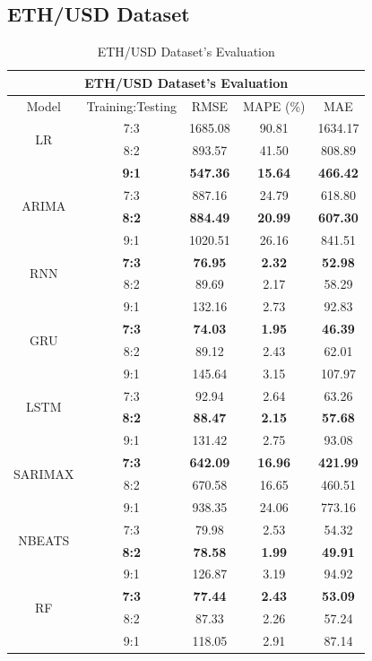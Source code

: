 \documentclass{ieeeojies}
\begin{document}
\subsection{ETH/USD Dataset}
\begin{table}[H]
	\centering
	\begin{tabular}{|c|c|c|c|c|}
		\hline
		\multicolumn{5}{|c|}{\textbf{ETH/USD Dataset's Evaluation}}\\
		\hline
		\centering Model & Training:Testing & RMSE & MAPE (\%) & MAE\\
		\hline
		\multirow{2}{*}{LR} & 7:3 & 1685.08 &  90.81 &  1634.17 \\ & 8:2 & 893.57 & 41.50 & 808.89 \\ & \textbf{9:1} & \textbf{547.36} & \textbf{15.64} & \textbf{466.42}\\
		\hline
		\multirow{2}{*}{ARIMA} & 7:3 & 887.16 & 24.79 & 618.80 \\ & \textbf{8:2} & \textbf{884.49}& \textbf{20.99} & \textbf{607.30} \\ & 9:1 & 1020.51 & 26.16 & 841.51\\
		\hline
		\multirow{2}{*}{RNN} & \textbf{7:3} & \textbf{76.95} & \textbf{2.32} & \textbf{52.98}\\ & 8:2& 89.69 & 2.17 & 58.29 \\ & 9:1 & 132.16 & 2.73 & 92.83\\
		\hline
		\multirow{2}{*}{GRU} & \textbf{7:3}	& \textbf{74.03} &  \textbf{1.95} &  \textbf{46.39} \\ & 8:2 & 89.12 & 2.43 & 62.01 \\ & 9:1 & 145.64  & 3.15 & 107.97\\
		\hline
		\multirow{2}{*}{LSTM} & 7:3 &  92.94 &  2.64 & 63.26 \\ & \textbf{8:2} &  \textbf{88.47} & \textbf{2.15} &  \textbf{57.68} \\ & 9:1 & 131.42  & 2.75 & 93.08\\
		\hline
		\multirow{2}{*}{SARIMAX} & \textbf{7:3}	& \textbf{642.09} & \textbf{16.96} &  \textbf{421.99} \\ & 8:2 & 670.58 & 16.65 & 460.51 \\ & 9:1 & 938.35 &  24.06 & 773.16\\
		\hline
		\multirow{2}{*}{NBEATS} & 7:3 & 79.98 & 2.53 & 54.32 \\ & \textbf{8:2} & \textbf{78.58} & \textbf{1.99} & \textbf{49.91} \\ & 9:1 & 126.87	& 3.19 & 94.92 \\
		\hline
		\multirow{2}{*}{RF} & \textbf{7:3} & \textbf{77.44} & \textbf{2.43} & \textbf{53.09} \\ & 8:2 & 87.33 & 2.26 & 57.24 \\ & 9:1 & 118.05 & 2.91 & 87.14 \\
		\hline
	\end{tabular}
	\caption{ETH/USD Dataset's Evaluation}
	\label{ethresult}
\end{table}
\end{document}
